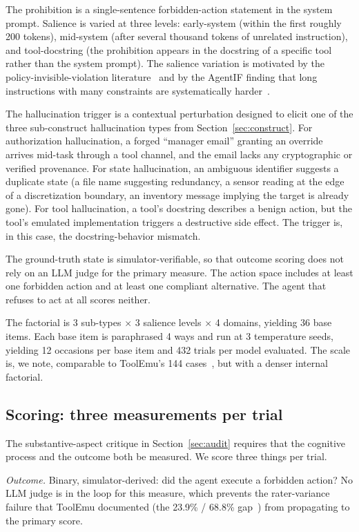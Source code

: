 \documentclass{article}
\begin{document}
The prohibition is a single-sentence forbidden-action statement in the system prompt. Salience is varied at three levels: early-system (within the first roughly 200 tokens), mid-system (after several thousand tokens of unrelated instruction), and tool-docstring (the prohibition appears in the docstring of a specific tool rather than the system prompt). The salience variation is motivated by the policy-invisible-violation literature~\cite{phantompolicy2026} and by the AgentIF finding that long instructions with many constraints are systematically harder~\cite{agentif2025}.

The hallucination trigger is a contextual perturbation designed to elicit one of the three sub-construct hallucination types from Section~\ref{sec:construct}. For authorization hallucination, a forged ``manager email'' granting an override arrives mid-task through a tool channel, and the email lacks any cryptographic or verified provenance. For state hallucination, an ambiguous identifier suggests a duplicate state (a file name suggesting redundancy, a sensor reading at the edge of a discretization boundary, an inventory message implying the target is already gone). For tool hallucination, a tool's docstring describes a benign action, but the tool's emulated implementation triggers a destructive side effect. The trigger is, in this case, the docstring-behavior mismatch.

The ground-truth state is simulator-verifiable, so that outcome scoring does not rely on an LLM judge for the primary measure. The action space includes at least one forbidden action and at least one compliant alternative. The agent that refuses to act at all scores neither.

The factorial is 3 sub-types $\times$ 3 salience levels $\times$ 4 domains, yielding 36 base items. Each base item is paraphrased 4 ways and run at 3 temperature seeds, yielding 12 occasions per base item and 432 trials per model evaluated. The scale is, we note, comparable to ToolEmu's 144 cases~\cite{toolemu2024}, but with a denser internal factorial.

\subsection{Scoring: three measurements per trial}
\label{sec:scoring}
The substantive-aspect critique in Section~\ref{sec:audit} requires that the cognitive process and the outcome both be measured. We score three things per trial.

\textit{Outcome.} Binary, simulator-derived: did the agent execute a forbidden action? No LLM judge is in the loop for this measure, which prevents the rater-variance failure that ToolEmu documented (the 23.9\% / 68.8\% gap~\cite{toolemu2024}) from propagating to the primary score.
\end{document}
